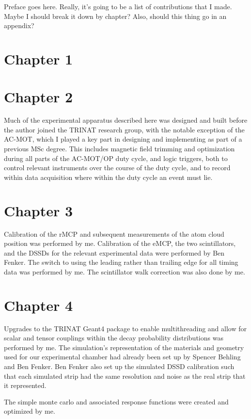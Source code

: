

\clearpage
\begin{preface}
Preface goes here.  Really, it's going to be a list of contributions that I made.  Maybe I should break it down by chapter?  Also, should this thing go in an appendix?

\section{Chapter 1}
\section{Chapter 2}
Much of the experimental apparatus described here was designed and built before the author joined the TRINAT research group, with the notable exception of the AC-MOT, which I played a key part in designing and implementing as part of a previous MSc degree.  This includes magnetic field trimming and optimization during all parts of the AC-MOT/OP duty cycle, and logic triggers, both to control relevant instruments over the course of the duty cycle, and to record within data acquisition where within the duty cycle an event must lie.  
\section{Chapter 3}
Calibration of the rMCP and subsequent measurements of the atom cloud position was performed by me.  Calibration of the eMCP, the two scintillators, and the DSSDs for the relevant experimental data were performed by Ben Fenker.  The switch to using the leading rather than trailing edge for all timing data was performed by me.  The scintillator walk correction was also done by me.  
\section{Chapter 4}
Upgrades to the TRINAT Geant4 package to enable multithreading and allow for scalar and tensor couplings within the decay probability distributions was performed by me.  The simulation's representation of the materials and geometry used for our experimental chamber had already been set up by Spencer Behling and Ben Fenker.  Ben Fenker also set up the simulated DSSD calibration such that each simulated strip had the same resolution and noise as the real strip that it represented.  

The simple monte carlo and associated response functions were created and optimized by me.  


\end{preface}
